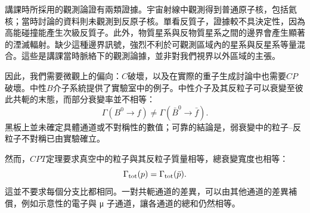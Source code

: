 \begin{classroomqa}
\end{classroomqa}

講課時所採用的觀測論證有兩類證據。宇宙射線中觀測得到普通原子核，包括氦核；當時討論的資料則未觀測到反原子核。單看反質子，證據較不具決定性，因為高能碰撞能產生次級反質子。此外，物質星系與反物質星系之間的邊界會產生顯著的湮滅輻射。缺少這種邊界訊號，強烈不利於可觀測區域內的星系與反星系等量混合。這些是講課當時脈絡下的觀測論據，並非對我們視界以外區域的主張。

\begin{classroomqa}
\end{classroomqa}

因此，我們需要微觀上的偏向：\(C\)破壞，以及在實際的重子生成討論中也需要\(CP\)破壞。中性\(B\)介子系統提供了實驗室中的例子。中性介子及其反粒子可以衰變至彼此共軛的末態，而部分衰變率並不相等：
\begin{equation}
\Gamma(B^0\to f)\ne\Gamma(\bar B^0\to\bar f).
\label{eq:c08-cp-partial}
\end{equation}
黑板上並未確定具體通道或不對稱性的數值；可靠的結論是，弱衰變中的粒子--反粒子不對稱已由實驗確立。

然而，\(CPT\)定理要求真空中的粒子與其反粒子質量相等，總衰變寬度也相等：
\begin{equation}
\Gamma_{\rm tot}(p)=\Gamma_{\rm tot}(\bar p).
\end{equation}
這並不要求每個分支比都相同。一對共軛通道的差異，可以由其他通道的差異補償，例如示意性的電子與 {\proseunicodefont μ} 子通道，讓各通道的總和仍然相等。

\begin{classroomqa}
\end{classroomqa}

